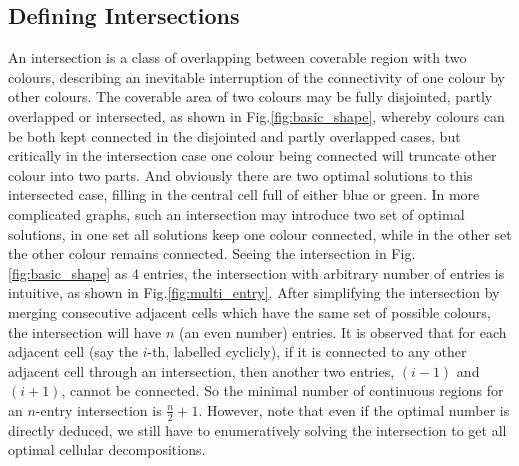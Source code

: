 \documentclass[conference]{IEEEtran}
\begin{document}
\subsection{Defining Intersections}
An intersection is a class of overlapping between coverable region with two colours, describing an inevitable interruption of the connectivity of one colour 
by other colours. 
The coverable area of two colours may be fully disjointed, partly overlapped or intersected, as shown in Fig.\ref{fig:basic_shape}, 
whereby colours can be both kept connected in the disjointed and partly overlapped cases, but critically in the intersection case one colour being connected will truncate other colour into two parts. 
And obviously there are two optimal solutions to this intersected case, filling in the central cell full of either blue or green.
In more complicated graphs, such an intersection may introduce two set of optimal solutions, in one set all solutions keep one colour connected, 
while in the other set the other colour remains connected. Seeing the intersection in Fig.\ref{fig:basic_shape} as $4$ entries, the intersection with arbitrary number of entries is intuitive, as shown in Fig.\ref{fig:multi_entry}. After simplifying the intersection by merging consecutive adjacent cells which have the same set of possible colours, the intersection will have $n$ (an even number) entries. 
It is observed that for each adjacent cell (say the $i$-th, labelled cyclicly), if it is connected to any other adjacent cell through an intersection, then another two entries, $(i-1)$ and $(i+1)$, cannot be connected. So the minimal number of continuous regions for an $n$-entry intersection is $\frac{n}{2}+1$. 
However, note that even if the optimal number is directly deduced, we still have to enumeratively solving the intersection to get all optimal cellular decompositions. 

\end{document}
